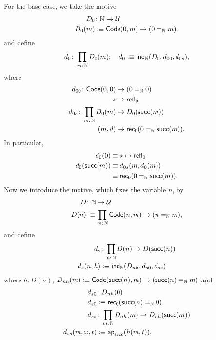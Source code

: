 \begin{description}[font=\normalfont\scshape]
    For the base case, we take the motive
    \begin{align*}
         D_0&\colon\N\to\univ\\
         D_0(m)&\defeq\fun{Code}(0,m)\to(0\eq\N m),
    \end{align*}
    and define
    \[
        d_0\colon\prod_{m\colon\N}D_0(m);
            \quad d_0\defeq\fun{ind}_\N(D_0,d_{00},d_{0s}),
    \]
    where
    \begin{align*}
        d_{00}\colon\fun{Code}(0,0)&\to(0\eq\N0)\\
        \fun\star&\mapsto\fun{refl}_0\\
        d_{0s}\colon\prod_{m\colon\N}D_0(m)&\to D_0(\fun{succ}(m))\\
        (m,d)&\mapsto\fun{rec}_{\fun0}(0\eq\N\fun{succ}(m)).
    \end{align*}
    In particular,
    \begin{equation}\label{eq:d0}
        \begin{aligned}
            d_0(0)
                &\equiv\mathsf{\star}\mapsto\mathsf{refl}_0\\
            d_0(\mathsf{succ}(m))
                &\equiv d_{0s}(m,d_0(m))\\
                &\equiv\mathsf{rec}_{\mathsf{0}}(0\mathrel{=_{\mathbb{N}}}\mathsf{succ}(m)).
        \end{aligned}
    \end{equation}
    Now we introduce the motive, which fixes the variable $n$, by
    \begin{align*}
        D&\colon\N\to\univ\\
        D(n)&\defeq\prod_{m\colon\N}\fun{Code}(n,m)\to(n\eq\N m),
    \end{align*}
    and define
    \begin{align*}
        d_s&\colon\prod_{n\colon\N}D(n)\to D(\fun{succ}(n))\\
        d_s(n,h)&\defeq\fun{ind}_\N(D_{nh},d_{s0},d_{ss})
    \end{align*}
    where $h\colon D(n)$, $D_{nh}(m)\mathrel{\vcentcolon}\equiv\mathsf{Code}(\mathsf{succ}(n),m)\to(\mathsf{succ}(n)\mathrel{=_{\mathbb{N}}} m)$ and
    \begin{align*}
        d_{s0}&\colon D_{nh}(0)\\
        d_{s0}&\defeq\fun{rec}_{\fun0}(\fun{succ}(n)\eq\N0)\\
        d_{ss}&\colon\prod_{m\colon\N}D_{nh}(m)\to D_{nh}(\fun{succ}(m))\\
        d_{ss}(m,\omega,t)&\defeq\fun{ap}_{\fun{succ}}(h(m,t)),
    \end{align*}

\end{description}
